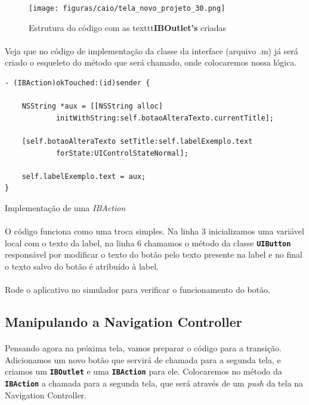 \documentclass[a4paper,12pt,brazil,doubleside]{book}
\begin{document}
\begin{singlespace}
\begin{figure}[H]
  \centering
  \texttt{[image: figuras/caio/tela\_novo\_projeto\_30.png]}
  \caption{Estrutura do código com as texttt{\textbf{IBOutlet's}} criadas}
  \label{fig:a}
\end{figure}

\paragraph{}Veja que no código de implementação da classe da interface (arquivo .m) já será criado o esqueleto do método que será chamado, onde colocaremos nossa lógica.

\begin{listing}[H]
\begin{verbatim}
- (IBAction)okTouched:(id)sender {
    
    NSString *aux = [[NSString alloc] 
    		initWithString:self.botaoAlteraTexto.currentTitle];
    
    [self.botaoAlteraTexto setTitle:self.labelExemplo.text 
    		forState:UIControlStateNormal];
    
    self.labelExemplo.text = aux;
}
\end{verbatim}
\caption{Implementação de uma \emph{IBAction}}
\end{listing}

\paragraph{}O código funciona como uma troca simples. Na linha 3 inicializamos uma variável local com o texto da label, na linha 6 chamamos o método da classe \texttt{\textbf{UIButton}} responsável por modificar o texto do botão pelo texto presente na label e no final o texto salvo do botão é atribuído à label.
\paragraph{}Rode o aplicativo no simulador para verificar o funcionamento do botão.

\bigskip

\subsection{Manipulando a Navigation Controller}

\paragraph{}Pensando agora na próxima tela, vamos preparar o código para a transição. Adicionamos um novo botão que servirá de chamada para a segunda tela, e criamos um \texttt{\textbf{IBOutlet}} e uma \texttt{\textbf{IBAction}} para ele. Colocaremos no método da \texttt{\textbf{IBAction}} a chamada para a segunda tela, que será através de um \emph{push} da tela na Navigation Controller.


\end{singlespace}
\end{document}
